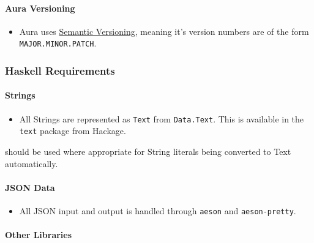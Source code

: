 \documentclass{article}
\begin{document}
\paragraph{Aura Versioning}\label{aura-versioning}

\begin{itemize}
\itemsep1pt\parskip0pt
\item
  Aura uses \href{http://semver.org/}{Semantic Versioning}, meaning it's
  version numbers are of the form \texttt{MAJOR.MINOR.PATCH}.
\end{itemize}

\subsubsection{Haskell Requirements}\label{haskell-requirements}

\paragraph{Strings}\label{strings}

\begin{itemize}
\itemsep1pt\parskip0pt
\item
  All Strings are represented as \texttt{Text} from \texttt{Data.Text}.
  This is available in the \texttt{text} package from Hackage.
\end{itemize}

\begin{Shaded}
\begin{Highlighting}[]
\end{Highlighting}
\end{Shaded}

should be used where appropriate for String literals being converted to
Text automatically.

\paragraph{JSON Data}\label{json-data}

\begin{itemize}
\itemsep1pt\parskip0pt
\item
  All JSON input and output is handled through \texttt{aeson} and
  \texttt{aeson-pretty}.
\end{itemize}

\paragraph{Other Libraries}\label{other-libraries}
\end{document}
